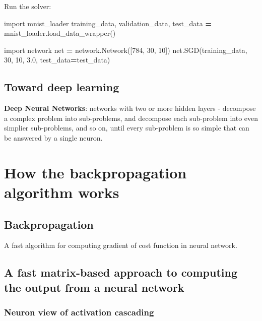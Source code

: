 \documentclass[]{book}
\newenvironment{Shaded}{\begin{snugshade}}{\end{snugshade}}
\newcommand{\DecValTok}[1]{\textcolor[rgb]{0.00,0.00,0.81}{{#1}}}
\newcommand{\FloatTok}[1]{\textcolor[rgb]{0.00,0.00,0.81}{{#1}}}
\newcommand{\ImportTok}[1]{{#1}}
\newcommand{\OperatorTok}[1]{\textcolor[rgb]{0.81,0.36,0.00}{\textbf{{#1}}}}
\newcommand{\NormalTok}[1]{{#1}}
\begin{document}
Run the solver:

\begin{Shaded}
\begin{Highlighting}[]
\ImportTok{import} \NormalTok{mnist_loader}
\NormalTok{training_data, validation_data, test_data }\OperatorTok{=} \NormalTok{mnist_loader.load_data_wrapper()}

\ImportTok{import} \NormalTok{network}
\NormalTok{net }\OperatorTok{=} \NormalTok{network.Network([}\DecValTok{784}\NormalTok{, }\DecValTok{30}\NormalTok{, }\DecValTok{10}\NormalTok{])}
\NormalTok{net.SGD(training_data, }\DecValTok{30}\NormalTok{, }\DecValTok{10}\NormalTok{, }\FloatTok{3.0}\NormalTok{, test_data}\OperatorTok{=}\NormalTok{test_data)}
\end{Highlighting}
\end{Shaded}

\section{Toward deep learning}\label{toward-deep-learning}

\textbf{Deep Neural Networks}: networks with two or more hidden layers -
decompose a complex problem into sub-problems, and decompose each
sub-problem into even simplier sub-problems, and so on, until every
sub-problem is so simple that can be answered by a single neuron.

\chapter{How the backpropagation algorithm works}\label{bkpg}

\section{Backpropagation}\label{backpropagation}

A fast algorithm for computing gradient of cost function in neural
network.

\section{A fast matrix-based approach to computing the output from a
neural
network}\label{a-fast-matrix-based-approach-to-computing-the-output-from-a-neural-network}

\subsection{Neuron view of activation
cascading}\label{neuron-view-of-activation-cascading}
\end{document}
